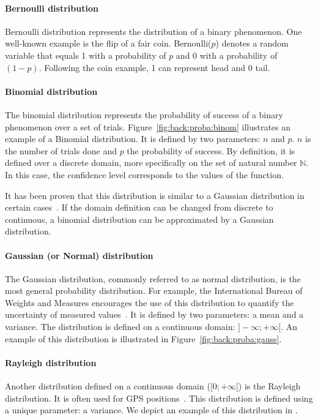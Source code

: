 \paragraph{Bernoulli distribution}
Bernoulli distribution represents the distribution of a binary phenomenon.
One well-known example is the flip of a fair coin.
Bernoulli($p$) denotes a random variable that equals 1 with a probability of $p$ and 0 with a probability of $(1 - p)$.
Following the coin example, 1 can represent head and 0 tail.

\paragraph{Binomial distribution}
The binomial distribution represents the probability of success of a binary phenomenon over a set of trials.
Figure~\ref{fig:back:proba:binom} illustrates an example of a Binomial distribution.
It is defined by two parameters: $n$ and $p$.
$n$ is the number of trials done and $p$ the probability of success.
By definition, it is defined over a discrete domain, more specifically on the set of natural number $\mathds{N}$.
In this case, the confidence level corresponds to the values of the function.

It has been proven that this distribution is similar to a Gaussian distribution in certain cases~\cite{box2005}.
If the domain definition can be changed from discrete to continuous, a binomial distribution can be approximated by a Gaussian distribution. 

\paragraph{Gaussian (or Normal) distribution}
The Gaussian distribution, commonly referred to as normal distribution, is the most general probability distribution.
For example, the International Bureau of Weights and Measures encourages the use of this distribution to quantify the uncertainty of measured values~\cite{metrology2008evaluation}.
It is defined by two parameters: a mean and a variance.
The distribution is defined on a continuous domain: $]-\infty; +\infty[$.
An example of this distribution is illustrated in Figure~\ref{fig:back:proba:gauss}.

\paragraph{Rayleigh distribution}
Another distribution defined on a continuous domain ($[0; +\infty[$) is the Rayleigh distribution.
It is often used for GPS positions~\cite{bornholt2013abstractions}.
This distribution is defined using a unique parameter: a variance.
We depict an example of this distribution in .

